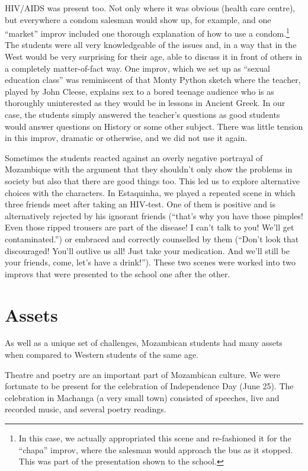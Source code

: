 \documentclass[article,twocolumn,twoside]{memoir}
\begin{document}
HIV/AIDS was present too. Not only where it was obvious (health care centre),
but everywhere a condom salesman would show up, for example, and one ``market''
improv included one thorough explanation of how to use a condom.\footnote{In
this case, we actually appropriated this scene and re-fashioned it for the
``chapa'' improv, where the salesman would approach the bus as it stopped. This
was part of the presentation shown to the school.} The students were all
very knowledgeable of the issues and, in a way that in the West would be very
surprising for their age, able to discuss it in front of others in a completely
matter-of-fact way. One improv, which we set up as ``sexual education class''
was reminiscent of that Monty Python sketch where the teacher, played by John
Cleese, explains sex to a bored teenage audience who is as thoroughly
uninterested as they would be in lessons in Ancient Greek. In our case, the
students simply answered the teacher's questions as good students would answer
questions on History or some other subject. There was little tension in this
improv, dramatic or otherwise, and we did not use it again.

Sometimes the students reacted against an overly negative portrayal of
Mozambique with the argument that they shouldn't only show the problems in
society but also that there are good things too. This led us to explore
alternative choices with the characters. In Estaquinha, we played a repeated
scene in which three friends meet after taking an HIV-test. One of them is
positive and is alternatively rejected by his ignorant friends (``that's why
you have those pimples! Even those ripped trousers are part of the disease! I
can't talk to you! We'll get contaminated.'') or embraced and correctly
counselled by them (``Don't look that discouraged! You'll outlive us all! Just
take your medication. And we'll still be your friends, come, let's have a
drink!''). These two scenes were worked into two improvs that were presented to
the school one after the other.

\chapter{Assets}
As well as a unique set of challenges, Mozambican students had many assets when
compared to Western students of the same age.

Theatre and poetry are an important part of Mozambican culture. We were
fortunate to be present for the celebration of Independence Day (June 25). The
celebration in Machanga (a very small town) consisted of speeches, live and
recorded music, and several poetry readings.
\end{document}
